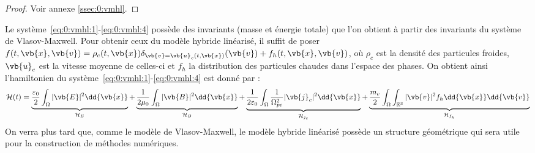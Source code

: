 \begin{proof}
  Voir annexe \ref{ssec:0:vmhl}.
\end{proof}

Le système~\eqref{eq:0:vmhl:1}-\eqref{eq:0:vmhl:4} possède des invariants (masse et énergie totale) que l'on obtient à partir des invariants du système de Vlasov-Maxwell. Pour obtenir ceux du modèle hybride linéarisé, il suffit de poser $f(t,\vb{x},\vb{v})=\rho_c(t,\vb{x})\delta_{\vb{v}=\vb{u}_c(t,\vb{x})}(\vb{v}) + f_h(t,\vb{x},\vb{v})$, où $\rho_c$ est la densité des particules froides, $\vb{u}_c$ est la vitesse moyenne de celles-ci et $f_h$ la distribution des particules chaudes dans l'espace des phases. On obtient ainsi l'hamiltonien du système~\eqref{eq:0:vmhl:1}-\eqref{eq:0:vmhl:4} est donné par :
\begin{equation}
  \mathcal{H}(t) = \underbrace{\frac{\varepsilon_0}{2} \int_{\Omega} |\vb{E}|^2 \dd{\vb{x}} }_{\mathcal{H}_E}
              + \underbrace{\frac{1}{2\mu_0}        \int_{\Omega} |\vb{B}|^2 \dd{\vb{x}} }_{\mathcal{H}_B}
              + \underbrace{\frac{1}{2\varepsilon_0}\int_{\Omega} \frac{1}{\Omega_{pe}^2}|\vb{j}_c|^2 \dd{\vb{x}} }_{\mathcal{H}_{j_c}}
              + \underbrace{\frac{m_e}{2}           \int_{\Omega}\int_{\mathbb{R}^3} |\vb{v}|^2f_h \dd{\vb{x}}\dd{\vb{v}} }_{\mathcal{H}_{f_h}}
\end{equation}
On verra plus tard que, comme le modèle de Vlasov-Maxwell, le modèle hybride linéarisé possède un structure géométrique qui sera utile pour la construction de méthodes numériques.
